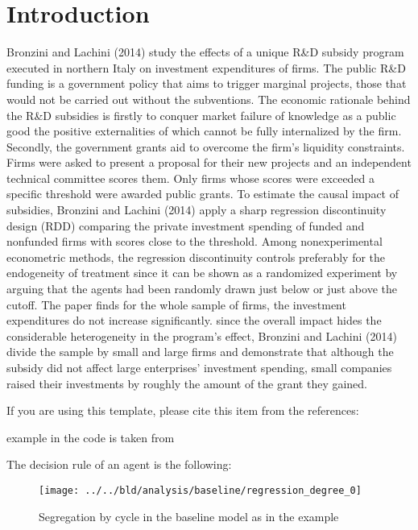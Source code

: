 \documentclass[11pt, a4paper, leqno]{article}
\begin{document}
\section{Introduction} %
\label{sec:introduction}
Bronzini and Lachini (2014) study the effects of a unique R\&D subsidy program
executed in northern Italy on investment expenditures of firms.
The public R\&D funding is a government policy that aims to trigger marginal projects,
those that would not be carried out without the subventions. The economic rationale
behind the R\&D subsidies is firstly to conquer market failure of knowledge as a
public good the positive externalities of which cannot be fully internalized by the
firm. Secondly, the government grants aid to overcome the firm's liquidity
constraints. Firms were asked to present a proposal for their new projects and
an independent technical committee scores them. Only firms whose scores were exceeded
a specific threshold were awarded public grants. To estimate the causal impact of
subsidies, Bronzini and Lachini (2014) apply a sharp regression discontinuity design
(RDD) comparing the private investment spending of funded and nonfunded firms with
scores close to the threshold. Among nonexperimental econometric methods, the
regression discontinuity controls preferably for the endogeneity of treatment since
it can be shown as a randomized experiment by arguing that the agents had been
randomly drawn just below or just above the cutoff. The paper finds for the whole
sample of firms, the investment expenditures do not increase significantly.
since the overall impact hides the considerable heterogeneity in the program’s effect,
Bronzini and Lachini (2014) divide the sample by small and large firms and demonstrate
that although the subsidy did not affect large enterprises' investment spending,
small companies raised their investments by roughly the amount of the grant they
gained.


If you are using this template, please cite this item from the references: \citet{GaudeckerEconProjectTemplates}

\citet{Schelling69} example in the code is taken from \citet{StachurskiSargent13}

The decision rule of an agent is the following:


\begin{figure}
    \caption{Segregation by cycle in the baseline \citet{Schelling69} model as in the \citet{StachurskiSargent13} example}

    \texttt{[image: ../../bld/analysis/baseline/regression\_degree\_0]}

\end{figure}
\end{document}
